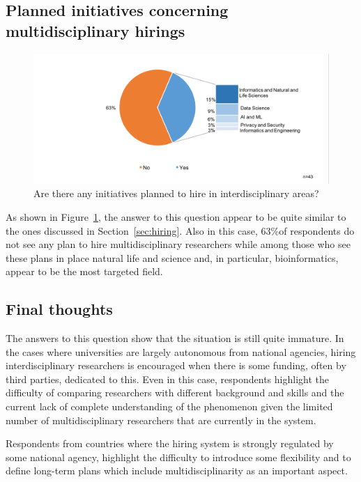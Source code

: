 \subsection{Planned initiatives concerning multidisciplinary hirings}

\begin{figure}[h]
\centering
\includegraphics[width = \linewidth]{charts/3d.png}
\caption{Are there any initiatives planned to hire in interdisciplinary areas?}
\label{sect3:planned}
\end{figure}

As shown in Figure~\ref{sect3:planned}, the answer to this question appear to be quite similar to the ones
discussed in Section~\ref{sec:hiring}. Also in this case, 63\%of
respondents do not see any plan to hire multidisciplinary researchers
while among those who see these plans in place natural life and
science and, in particular, bioinformatics, appear to be the most
targeted field. 

\subsection{Final thoughts}

The answers to this question show that the situation is still quite
immature. In the cases where universities are largely autonomous from
national agencies, hiring interdisciplinary researchers is
encouraged when there is some funding, often by third parties, dedicated to
this. Even in this case, respondents highlight the difficulty of comparing
researchers with different background and skills and the current
lack of complete understanding of the phenomenon given the limited
number of multidisciplinary researchers that are currently in the
system. 

Respondents from countries where the hiring system is strongly
regulated by some national agency, highlight the difficulty to
introduce some flexibility and to define long-term plans
which include multidisciplinarity as an important aspect. 
